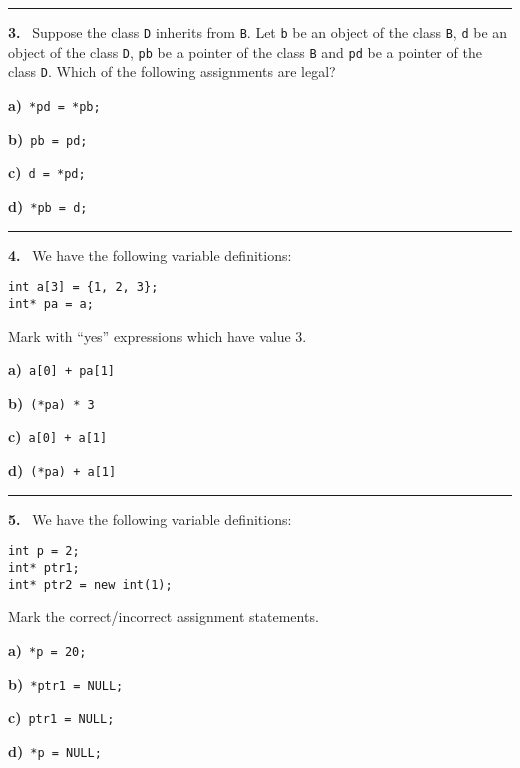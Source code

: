 \begin{multicols}{2}
\par\smallskip\hrule\par\medskip

{\bf 3. }\ Suppose the class \verb|D| inherits from \verb|B|. Let
\verb|b| be an object of the class \verb|B|,
\verb|d| be an object of the class \verb|D|,
\verb|pb| be a pointer of the class \verb|B| and
\verb|pd| be a pointer of the class \verb|D|.
Which of the following assignments are legal?

{\bf a)}\ \verb|*pd = *pb;|

{\bf b)}\ \verb|pb = pd;|

{\bf c)}\ \verb|d = *pd;|

{\bf d)}\ \verb|*pb = d;|

\par\smallskip\hrule\par\medskip

{\bf 4. }\ We have the following variable definitions:
 \vspace{-3mm}\begin{verbatim}
int a[3] = {1, 2, 3};
int* pa = a;
 \end{verbatim}\vspace{-6mm}
Mark with ``yes'' expressions which have value 3.

{\bf a)}\ \verb|a[0] + pa[1]|

{\bf b)}\ \verb|(*pa) * 3|

{\bf c)}\ \verb|a[0] + a[1]|

{\bf d)}\ \verb|(*pa) + a[1]|

\par\smallskip\hrule\par\medskip

{\bf 5. }\ We have the following variable definitions:
 \vspace{-3mm}\begin{verbatim}
int p = 2;
int* ptr1;
int* ptr2 = new int(1);
 \end{verbatim}\vspace{-6mm}
Mark the correct/incorrect assignment statements.

{\bf a)}\ \verb|*p = 20;|

{\bf b)}\ \verb|*ptr1 = NULL;|

{\bf c)}\ \verb|ptr1 = NULL;|

{\bf d)}\ \verb|*p = NULL;|

\end{multicols}


